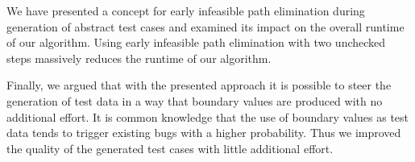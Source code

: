 \documentclass[runningheads,a4paper]{llncs}%
\begin{document}
We have presented a concept for early infeasible path elimination during generation of abstract test cases and examined its impact on the overall runtime of our algorithm. Using early infeasible path elimination with two unchecked steps massively reduces the runtime of our algorithm.

Finally, we argued that with the presented approach it is possible to steer the generation of test data in a way that boundary values are produced with no additional effort. It is common knowledge that the use of boundary values as test data tends to trigger existing bugs with a higher probability. Thus we improved the quality of the generated test cases with little additional effort.%
%
%
\end{document}
